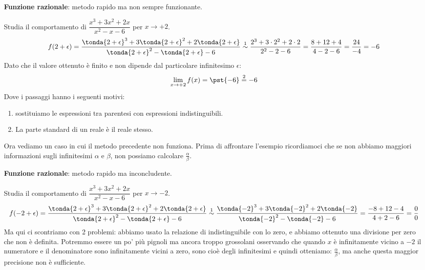 \begin{esempio}
\textbf{Funzione razionale}: metodo rapido ma non sempre funzionante.

Studia il comportamento di \(\dfrac{x^3+3x^2+2x}{x^2-x-6}\) per 
\(x \to +2\).
\[
f(2 + \epsilon) = \frac
  {\tonda{2+\epsilon}^3+3\tonda{2+\epsilon}^2+2\tonda{2+\epsilon}}
  {\tonda{2+\epsilon}^2-\tonda{2+\epsilon}-6} \stackrel{1}{\sim} 
  \frac{2^3+3\cdot 2^2+2\cdot 2}{2^2-2-6} =
  \frac{8+12+4}{4-2-6} = \frac{24}{-4} = -6
\]
Dato che il valore ottenuto è finito e non dipende dal particolare 
infinitesimo \(\epsilon\):
\[\lim_{x \to +2} f(x) = \pst{-6} \stackrel{2}{=} -6\]
Dove i passaggi hanno i seguenti motivi:
\begin{enumerate} [nosep]
 \item sostituiamo le espressioni tra parentesi con espressioni 
indistinguibili.
 \item La parte standard di un reale è il reale stesso.
\end{enumerate}
\end{esempio}

Ora vediamo un caso in cui il metodo precedente non funziona. Prima di 
affrontare l'esempio ricordiamoci che se non abbiamo maggiori informazioni 
sugli infinitesimi \(\alpha\) e \(\beta\), non possiamo calcolare 
\(\frac{\alpha}{\beta}\).

\begin{esempio}
\textbf{Funzione razionale}: metodo rapido ma inconcludente.

Studia il comportamento di \(\dfrac{x^3+3x^2+2x}{x^2-x-6}\) per 
\(x \to -2\).
\[
f(-2 + \epsilon) =\frac
  {\tonda{2+\epsilon}^3+3\tonda{2+\epsilon}^2+2\tonda{2+\epsilon}}
  {\tonda{2+\epsilon}^2-\tonda{2+\epsilon}-6} \stackrel{1}{\sim} 
  \frac
  {\tonda{-2}^3+3\tonda{-2}^2+2\tonda{-2}}
  {\tonda{-2}^2-\tonda{-2}-6} = 
  \frac{-8+12-4}{4+2-6} = \frac{0}{0}
\]
Ma qui ci scontriamo con 2 problemi: abbiamo usato la relazione di 
indistinguibile con lo zero, e abbiamo ottenuto una divisione per zero che 
non è definita. Potremmo essere un po' più pignoli ma ancora troppo 
grossolani osservando che quando \(x\) è infinitamente vicino a \(-2\) il 
numeratore e il denominatore sono infinitamente vicini a zero, sono cioè 
degli infinitesimi e quindi otteniamo: \(\frac{\alpha}{\beta}\), ma anche 
questa maggior precisione non è sufficiente.

\end{esempio}

